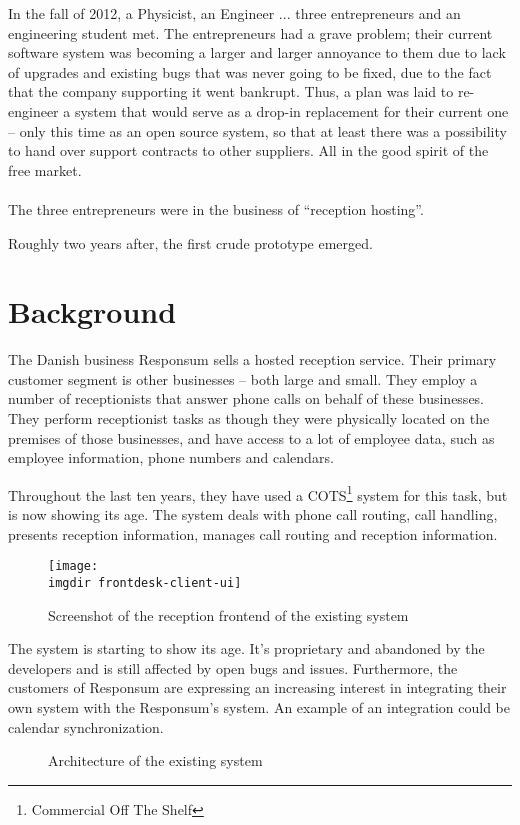 In the fall of 2012, a Physicist, an Engineer ... three entrepreneurs and an engineering student met. The entrepreneurs had a grave problem; their current software system was becoming a larger and larger annoyance to them due to lack of upgrades and existing bugs that was never going to be fixed, due to the fact that the company supporting it went bankrupt. Thus, a plan was laid to re-engineer a system that would serve as a drop-in replacement for their current one -- only this time as an open source system, so that at least there was a possibility to hand over support contracts to other suppliers. All in the good spirit of the free market.\\\\
The three entrepreneurs were in the business of ``reception hosting''.

Roughly two years after, the first crude prototype emerged.


\section{Background}
The Danish business Responsum sells a hosted reception service. Their primary customer segment is other businesses -- both large and small. They employ a number of receptionists that answer phone calls on behalf of these businesses. They perform receptionist tasks as though they were physically located on the premises of those businesses, and have access to a lot of employee data, such as employee information, phone numbers and calendars.

Throughout the last ten years, they have used a COTS\footnote{Commercial Off The Shelf} system for this task, but is now showing its age. The system deals with phone call routing, call handling, presents reception information, manages call routing and reception information.
\begin{figure}[ht]
\centering
\texttt{[image: \\imgdir frontdesk-client-ui]}
\caption{Screenshot of the reception frontend of the existing system}
\label{fig:frontdesk_screenshot}
\end{figure}
The system is starting to show its age. It's proprietary and abandoned by the developers and is still affected by open bugs and issues. Furthermore, the customers of Responsum are expressing an increasing interest in integrating their own system with the Responsum's system. An example of an integration could be calendar synchronization.

\begin{figure}[ht]
\centering
\caption{Architecture of the existing system}
\label{fig:frontdesk_architecture}
\end{figure}